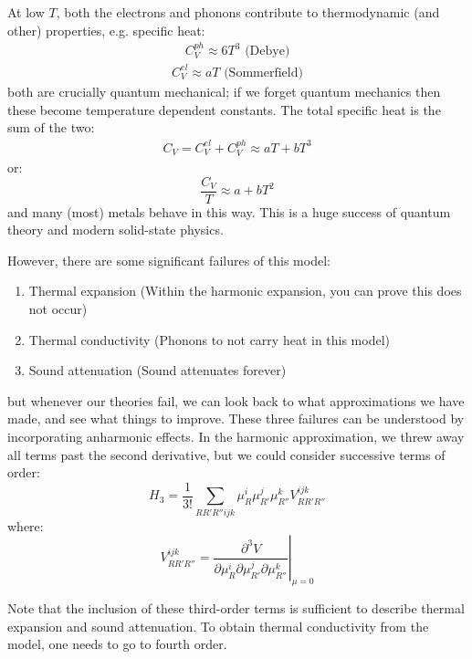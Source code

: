 At low $T$, both the electrons and phonons contribute to thermodynamic (and other) properties, e.g. specific heat:
\begin{align*}
    C_V^{ph} \approx 6T^3 \text{ (Debye)}
\end{align*}
\begin{align*}
    C_V^{el} \approx aT \text{ (Sommerfield)}
\end{align*}
both are crucially quantum mechanical; if we forget quantum mechanics then these become temperature dependent constants. The total specific heat is the sum of the two:
\begin{align*}
    C_V = C^{el}_V + C^{ph}_V \approx aT + bT^3
\end{align*}
or:
\begin{equation}
    \frac{C_V}{T} \approx a + bT^2
\end{equation}
and many (most) metals behave in this way. This is a huge success of quantum theory and modern solid-state physics.

However, there are some significant failures of this model:
\begin{enumerate}
    \item Thermal expansion (Within the harmonic expansion, you can prove this does not occur)
    \item Thermal conductivity (Phonons to not carry heat in this model)
    \item Sound attenuation (Sound attenuates forever)
\end{enumerate}
but whenever our theories fail, we can look back to what approximations we have made, and see what things to improve. These three failures can be understood by incorporating anharmonic effects. In the harmonic approximation, we threw away all terms past the second derivative, but we could consider successive terms of order:
\begin{equation}
    H_3 = \frac{1}{3!}\sum_{RR'R''ijk}\mu_R^i \mu_{R'}^j \mu_{R''}^{k} V^{ijk}_{RR'R''}
\end{equation}
where:
\begin{equation}
    V^{ijk}_{RR'R''} = \left. \frac{\partial^3 V}{\partial \mu_R^i \partial \mu_{R'}^j \partial \mu_{R''}^k}\right|_{\mu=0}
\end{equation}

Note that the inclusion of these third-order terms is sufficient to describe thermal expansion and sound attenuation. To obtain thermal conductivity from the model, one needs to go to fourth order.

